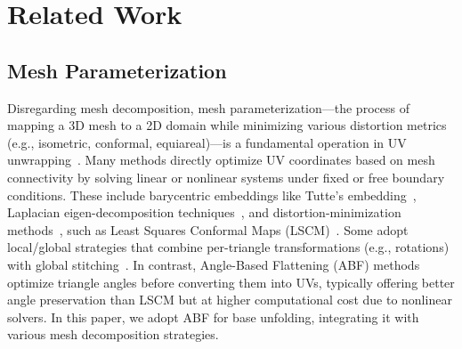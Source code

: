 \section{Related Work}
\subsection{Mesh Parameterization}

Disregarding mesh decomposition, mesh parameterization—the process of mapping a 3D mesh to a 2D domain while minimizing various distortion metrics (e.g., isometric, conformal, equiareal)—is a fundamental operation in UV unwrapping~\cite{sawhney2017boundary,schuller2013locally,rabinovich2017scalable}. Many methods directly optimize UV coordinates based on mesh connectivity by solving linear or nonlinear systems under fixed or free boundary conditions. These include barycentric embeddings like Tutte’s embedding~\cite{tutte1963draw}, Laplacian eigen-decomposition techniques~\cite{belkin2003laplacian,mullen2008spectral,taubin1995signal}, and distortion-minimization methods~\cite{hormann2000mips,sander2001texture,su2016area,yueh2019novel,yan2005mesh,desbrun2002intrinsic,Ray2003HierarchicalLS,ben2008conformal}, such as Least Squares Conformal Maps (LSCM)~\cite{lscm}. Some adopt local/global strategies that combine per-triangle transformations (e.g., rotations) with global stitching~\cite{sorkine2007rigid,liu2008local,alexa2023rigid}. In contrast, Angle-Based Flattening (ABF) methods~\cite{sheffer2001parameterization,sheffer2000surface,sheffer2005abf++,zayer2007linear} optimize triangle angles before converting them into UVs, typically offering better angle preservation than LSCM but at higher computational cost due to nonlinear solvers. In this paper, we adopt ABF for base unfolding, integrating it with various mesh decomposition strategies.

